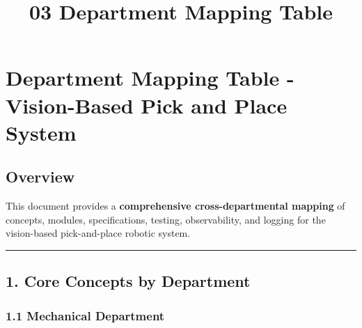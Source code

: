\documentclass[
]{article}
\title{03 Department Mapping Table}
\author{}
\date{}
\begin{document}
\maketitle

{
\setcounter{tocdepth}{3}
\tableofcontents
}
\hypertarget{department-mapping-table---vision-based-pick-and-place-system}{%
\section{Department Mapping Table - Vision-Based Pick and Place
System}\label{department-mapping-table---vision-based-pick-and-place-system}}

\hypertarget{overview}{%
\subsection{Overview}\label{overview}}

This document provides a \textbf{comprehensive cross-departmental
mapping} of concepts, modules, specifications, testing, observability,
and logging for the vision-based pick-and-place robotic system.

\begin{center}\rule{0.5\linewidth}{0.5pt}\end{center}

\hypertarget{core-concepts-by-department}{%
\subsection{1. Core Concepts by
Department}\label{core-concepts-by-department}}

\hypertarget{mechanical-department}{%
\subsubsection{1.1 Mechanical Department}\label{mechanical-department}}
\end{document}
